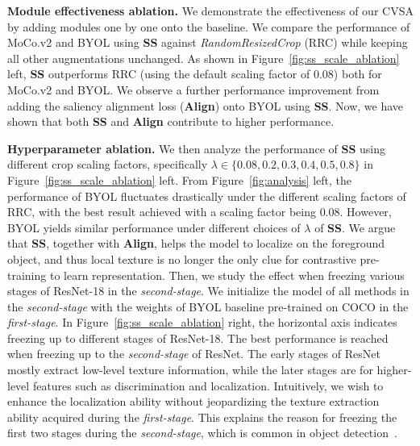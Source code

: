 \textbf{Module effectiveness ablation.}\quad
We demonstrate the effectiveness of our CVSA by adding modules one by one onto the baseline. We compare the performance of MoCo.v2 and BYOL using \textbf{SS} against \textit{RandomResizedCrop} (RRC) while keeping all other augmentations unchanged. As shown in Figure~\ref{fig:ss_scale_ablation} left, \textbf{SS} outperforms RRC (using the default scaling factor of $0.08$) both for MoCo.v2 and BYOL. We observe a further performance improvement from adding the saliency alignment loss (\textbf{Align}) onto BYOL using \textbf{SS}. Now, we have shown that both \textbf{SS} and \textbf{Align} contribute to higher performance.

\textbf{Hyperparameter ablation.}\quad
We then analyze the performance of \textbf{SS} using different crop scaling factors, specifically $\lambda \in \{0.08, 0.2, 0.3, 0.4, 0.5, 0.8\}$ in Figure~\ref{fig:ss_scale_ablation} left. From Figure~\ref{fig:analysis} left, the performance of BYOL fluctuates drastically under the different scaling factors of RRC, with the best result achieved with a scaling factor being $0.08$. However, BYOL yields similar performance under different choices of $\lambda$ of \textbf{SS}. We argue that \textbf{SS}, together with \textbf{Align}, helps the model to localize on the foreground object, and thus local texture is no longer the only clue for contrastive pre-training to learn representation. Then, we study the effect when freezing various stages of ResNet-18 in the \textit{second-stage}. We initialize the model of all methods in the \textit{second-stage} with the weights of BYOL baseline pre-trained on COCO in the \textit{first-stage}. In Figure~\ref{fig:ss_scale_ablation} right, the horizontal axis indicates freezing up to different stages of ResNet-18. The best performance is reached when freezing up to the \textit{second-stage} of ResNet. The early stages of ResNet mostly extract low-level texture information, while the later stages are for higher-level features such as discrimination and localization. Intuitively, we wish to enhance the localization ability without jeopardizing the texture extraction ability acquired during the \textit{first-stage}. This explains the reason for freezing the first two stages during the \textit{second-stage}, which is common in object detection~\cite{NIPS2015_14bfa6bb}.

